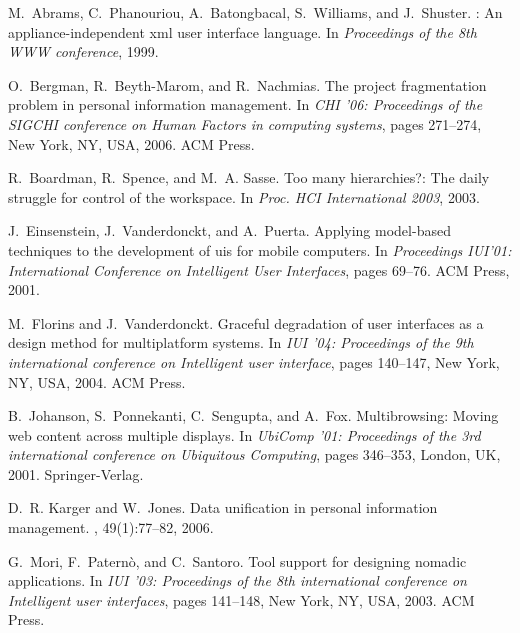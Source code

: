 \documentclass[twocolumn,final,10pt]{article}
\begin{document}
\begin{thebibliography}{10}

M.~Abrams, C.~Phanouriou, A.~Batongbacal, S.~Williams, and J.~Shuster.
: An appliance-independent xml user interface language.
\newblock In {\em Proceedings of the 8th {WWW} conference}, 1999.

O.~Bergman, R.~Beyth-Marom, and R.~Nachmias.
\newblock The project fragmentation problem in personal information management.
\newblock In {\em CHI '06: Proceedings of the SIGCHI conference on Human
  Factors in computing systems}, pages 271--274, New York, NY, USA, 2006. ACM
  Press.

R.~Boardman, R.~Spence, and M.~A. Sasse.
\newblock Too many hierarchies?: The daily struggle for control of the
  workspace.
\newblock In {\em Proc. HCI International 2003}, 2003.

J.~Einsenstein, J.~Vanderdonckt, and A.~Puerta.
\newblock Applying model-based techniques to the development of uis for mobile
  computers.
\newblock In {\em Proceedings IUI'01: International Conference on Intelligent
  User Interfaces}, pages 69--76. ACM Press, 2001.

M.~Florins and J.~Vanderdonckt.
\newblock Graceful degradation of user interfaces as a design method for
  multiplatform systems.
\newblock In {\em IUI '04: Proceedings of the 9th international conference on
  Intelligent user interface}, pages 140--147, New York, NY, USA, 2004. ACM
  Press.

B.~Johanson, S.~Ponnekanti, C.~Sengupta, and A.~Fox.
\newblock Multibrowsing: Moving web content across multiple displays.
\newblock In {\em UbiComp '01: Proceedings of the 3rd international conference
  on Ubiquitous Computing}, pages 346--353, London, UK, 2001. Springer-Verlag.

D.~R. Karger and W.~Jones.
\newblock Data unification in personal information management.
, 49(1):77--82, 2006.

G.~Mori, F.~Patern\`o, and C.~Santoro.
\newblock Tool support for designing nomadic applications.
\newblock In {\em IUI '03: Proceedings of the 8th international conference on
  Intelligent user interfaces}, pages 141--148, New York, NY, USA, 2003. ACM
  Press.


\end{thebibliography}
\end{document}
